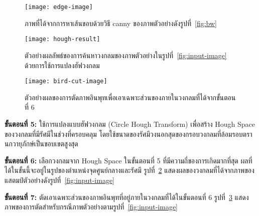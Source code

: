 \begin{figure}[!]
\centering
\vspace{2em}
\texttt{[image: edge-image]}
\vspace{2em}
\caption{ภาพที่ได้จากการหาเส้นขอบด้วยวิธี canny ของภาพตัวอย่างดังรูปที่~\ref{fig:bw}}
\label{fig:edge}
\end{figure}


\begin{figure}[!]
\centering
\vspace{2em}
\texttt{[image: hough-result]}
\vspace{2em}
\caption{ตัวอย่างผลลัพธ์ของการค้นหาวงกลมของภาพตัวอย่างในรูปที่~\ref{fig:input-image} ด้วยการใช้การแปลงฮัฟวงกลม}
\label{fig:hough-result}
\end{figure}


\begin{figure}[!]
\centering
\vspace{2em}
\texttt{[image: bird-cut-image]}
\vspace{2em}
\caption{ตัวอย่างผลของการตัดภาพอินพุทเพื่อเอาเฉพาะส่วนของภายในวงกลมที่ได้จากขั้นตอนที่ 6}
\label{fig:bird-cut-sample}
\end{figure}



\textbf{ขั้นตอนที่ 5:} ใช้การแปลงแบบฮัฟวงกลม (Circle Hough Transform) เพื่อสร้าง  Hough Space  ของวงกลมที่มีรัศมีในช่วงที่ครอบคลุม โดยใช้ขนาดของรัศมีวงนอกสุดของกรอบวงกลมที่ล้อมรอบตรานกวายุภักษ์เป็นขอบเขตสูงสุด

\textbf{ขั้นตอนที่ 6:} เลือกวงกลมจาก Hough Space ในขั้นตอนที่ 5 ที่มีความถี่ของการเกิดมากที่สุด ผลที่ได้ในขั้นนี้จะอยู่ในรูปของตำแหน่งจุดศูนย์กลางและรัศมี รูปที่~\ref{fig:hough-result} แสดงผลของวงกลมที่ได้จากภาพของแสตมป์ตัวอย่างดังรูปที่~\ref{fig:input-image}

\textbf{ขั้นตอนที่ 7:} ตัดเอาเฉพาะส่วนของภาพอินพุทที่อยู่ภายในวงกลมที่ได้ในขั้นตอนที่ 6 รูปที่~\ref{fig:bird-cut-sample} แสดงภาพของการตัดสำหรับกรณีภาพตัวอย่างตามรูปที่~\ref{fig:input-image}




